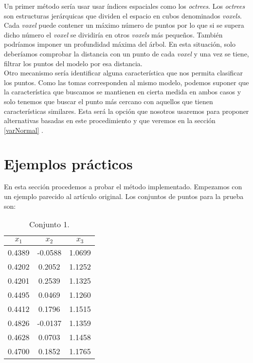 Un primer método sería usar usar índices espaciales como los \textit{octrees}. Los \textit{octrees} son estructuras jerárquicas que dividen el espacio en cubos denominados \textit{voxels}. Cada \textit{voxel} puede contener un máximo número de puntos por lo que si se supera dicho número el \textit{voxel} se dividiría en otros \textit{voxels} más pequeños. También podríamos imponer un profundidad máxima del árbol. En esta situación, solo deberíamos comprobar la distancia con un punto de cada \textit{voxel} y una vez se tiene, filtrar los puntos del modelo por esa distancia. \\

Otro mecanismo sería identificar alguna característica que nos permita clasificar los puntos. Como las tomas corresponden al mismo modelo, podemos suponer que la característica que buscamos se mantienen en cierta medida en ambos casos y solo tenemos que buscar el punto más cercano con aquellos que tienen características similares. Esta será la opción que nosotros usaremos para proponer alternativas basadas en este procedimiento y que veremos en la sección \ref{varNormal} .
\bigskip

\section{Ejemplos prácticos}\label{ejemPrac1}
En esta sección procedemos a probar el método implementado. Empezamos con un ejemplo parecido al artículo original. Los conjuntos de puntos para la prueba son:

\begin{table}[h!]
	\centering
	\begin{tabular}{| c | c | c |} 
		\hline
		$ x_1 $ & $ x_2 $ & $ x_3 $ \\
		\hline
		0.4389 & -0.0588 & 1.0699 \\ 
		0.4202 & 0.2052 & 1.1252 \\
		0.4201 &0.2539 & 1.1325 \\
		0.4495 & 0.0469 & 1.1260  \\
		0.4412 & 0.1796 & 1.1515 \\
		0.4826 & -0.0137 & 1.1359  \\
		0.4628 & 0.0703 & 1.1458 \\
		0.4700 & 0.1852 & 1.1765 \\
		\hline
	\end{tabular}
	\caption{Conjunto 1.}
	\label{table:1}
\end{table}


